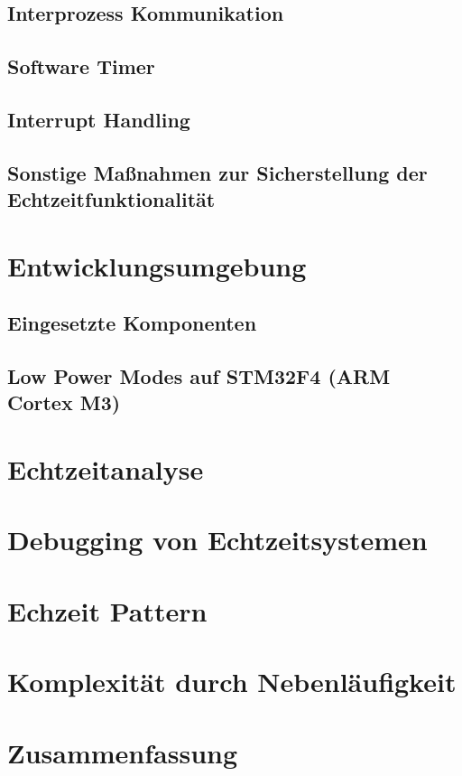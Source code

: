 \documentclass[ngerman]{seminarvorlage}
\begin{document}
\subsection{Interprozess Kommunikation}
\subsection{Software Timer}
\subsection{Interrupt Handling}
\subsection{Sonstige Maßnahmen zur Sicherstellung der Echtzeitfunktionalität}

\section{Entwicklungsumgebung}
\subsection{Eingesetzte Komponenten}
\subsection{Low Power Modes auf STM32F4 (ARM Cortex M3)}
\label{sec:Low Power Modes} 


\section{Echtzeitanalyse}
\label{sec:Echtzeitanalyse} 
\section{Debugging von Echtzeitsystemen} 
\section{Echzeit Pattern} 
\section{Komplexität durch Nebenläufigkeit} 
\section{Zusammenfassung}
\pagebreak

\end{document}
